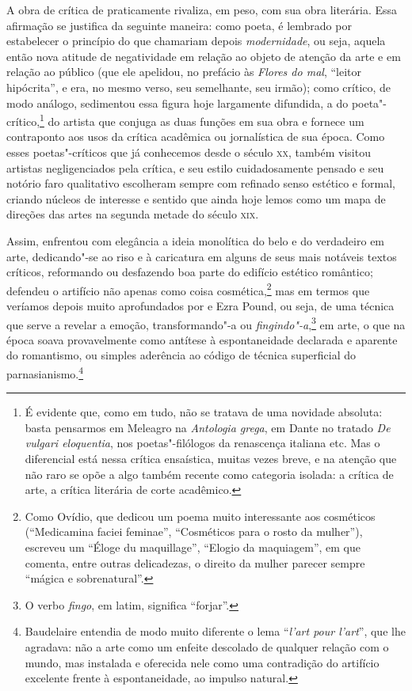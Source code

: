 A obra de crítica de  praticamente rivaliza, em peso, com sua
obra literária. Essa afirmação se justifica da seguinte maneira: como
poeta,  é lembrado por estabelecer o princípio do que
chamariam depois \textit{modernidade}, ou seja, aquela então nova
atitude de negatividade em relação ao objeto de atenção da arte e em
relação ao público (que ele apelidou, no prefácio às \textit{Flores do
mal}, “leitor hipócrita”, e era, no mesmo verso, seu semelhante, seu
irmão); como crítico, de modo análogo,  sedimentou essa
figura hoje largamente difundida, a do poeta"-crítico,\footnote{ É
evidente que, como em tudo, não se tratava de uma novidade absoluta:
basta pensarmos em Meleagro na \textit{Antologia grega}, em Dante no		
tratado \textit{De vulgari eloquentia}, nos poetas"-filólogos da
renascença italiana etc. Mas o diferencial está nessa crítica
ensaística, muitas vezes breve, e na atenção que não raro se opõe a
algo também recente como categoria isolada: a crítica de arte, a
crítica literária de corte acadêmico.} do artista que conjuga as duas
funções em sua obra e fornece um contraponto aos usos da crítica
acadêmica ou jornalística de sua época. Como esses poetas"-críticos que
já conhecemos desde o século \textsc{xx}, também  visitou artistas
negligenciados pela crítica, e seu estilo cuidadosamente pensado e seu 
notório faro qualitativo escolheram sempre com refinado senso estético
e formal, criando núcleos de interesse e sentido que ainda hoje lemos
como um mapa de direções das artes na segunda metade do século \textsc{xix}.

Assim, enfrentou com elegância a ideia monolítica do belo e do
verdadeiro em arte, dedicando"-se ao riso e à caricatura em alguns de
seus mais notáveis textos críticos, reformando ou desfazendo boa parte
do edifício estético romântico; defendeu o artifício não apenas como
coisa cosmética,\footnote{ Como Ovídio, que dedicou um poema muito	
interessante aos cosméticos (``Medicamina faciei feminae'',
“Cosméticos para o rosto da mulher”),  escreveu um
``Éloge du maquillage'', “Elogio da maquiagem”, em que comenta,
entre outras delicadezas, o direito da mulher parecer sempre “mágica e
sobrenatural”.} mas em termos que veríamos depois muito aprofundados
por  e Ezra Pound, ou seja, de uma técnica que serve a  
revelar a emoção, transformando"-a ou \textit{fingindo"-a},\footnote{ O
verbo \textit{fingo}, em latim, significa “forjar”.} em arte, o que
na época soava provavelmente como antítese à espontaneidade declarada e
aparente do romantismo, ou simples aderência ao código de técnica
superficial do parnasianismo.\footnote{ Baudelaire entendia de modo
muito diferente o lema “\textit{l’art pour l’art}”, que lhe agradava: não a arte
como um enfeite descolado de qualquer relação com o mundo, mas
instalada e oferecida nele como uma contradição do artifício excelente
frente à espontaneidade, ao impulso natural.} 

